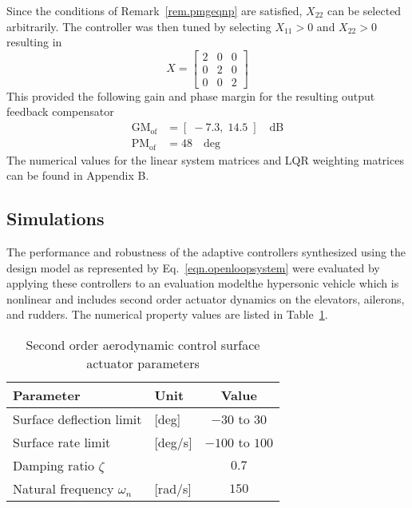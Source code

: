 \documentclass[]{../sty/JGCD}
\theoremstyle{examplestyle}
\begin{document}
  Since the conditions of Remark~\ref{rem.pmgeqnp} are satisfied, $X_{22}$ can be selected arbitrarily. The controller was then tuned by selecting $X_{11}>0$ and $X_{22}>0$ resulting in
  \begin{equation*}
    X=
    \left[
    \begin{array}{ccccc}
      2 & 0 & 0 \\
      0 & 2 & 0 \\
      0 & 0 & 2
    \end{array}\right]
  \end{equation*}
  This provided the following gain and phase margin for the resulting output feedback compensator
  \begin{align*}
    \text{GM}_{\text{of}}&=[\;-7.3,\; 14.5 \;] \quad \text{dB}\\
    \text{PM}_{\text{of}}&=48 \quad \text{deg}
  \end{align*}
  The numerical values for the linear system matrices and LQR weighting matrices can be found in Appendix B.

  \subsection{Simulations}

  The performance and robustness of the adaptive controllers synthesized using the design model as represented by Eq.\ \eqref{eqn.openloopsystem} were evaluated by applying these controllers to an evaluation model\textemdash{}the hypersonic vehicle which is nonlinear and includes second order actuator dynamics on the elevators, ailerons, and rudders. The numerical property values are listed in Table~\ref{tab:actuator}.

  \begin{table}[H]
    \renewcommand\thetable{1}
    \centering
    \caption{Second order aerodynamic control surface actuator parameters\label{tab:actuator}}
    \begin{tabular}{llc}
      \toprule
      Parameter & Unit & Value \\ \midrule
      Surface deflection limit & [deg] & $-30$ to $30$ \\
      Surface rate limit & [deg/s] & $-100$ to $100$ \\
      Damping ratio $\zeta$ & & $0.7$ \\
      Natural frequency $\omega_{n}$ & [rad/s] & $150$ \\
      \bottomrule
    \end{tabular}
  \end{table}
\end{document}

